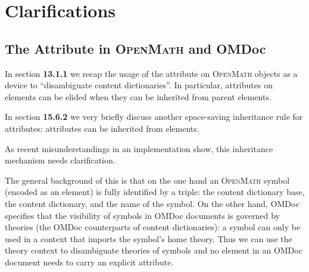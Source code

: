 \documentclass{article}
\def\omdoc{OMDoc}
\def\openmath{\scshape{OpenMath}}
\begin{document}
\newpage
\section{Clarifications}

\subsection{The {} Attribute in {\openmath} and {\omdoc}}

In section {\textbf{13.1.1}} we recap the usage of the {} attribute
on {\openmath} objects as a device to ``disambiguate content dictionaries''. In
particular, {} attributes on {}
elements can be elided when they can be inherited from parent elements.

In section {\textbf{15.6.2}} we very briefly discuss another space-saving inheritance rule
for {} attributes: {}
attributes can be inherited from {} elements. 

As recent misunderstandings in an implementation show, this inheritance mechanism needs
clarification. 

The general background of this is that on the one hand an {\openmath} symbol (encoded as
an {} element) is fully identified by a triple: the content
dictionary base, the content dictionary, and the name of the symbol. On the other hand,
{\omdoc} specifies that the visibility of symbols in {\omdoc} documents is governed by
theories (the {\omdoc} counterparts of content dictionaries): a symbol can only be used in
a context that imports the symbol's home theory. Thus we can use the theory context to
disambiguate theories of symbols and no {} element in an {\omdoc}
document needs to carry an explicit {} attribute.
\end{document}
